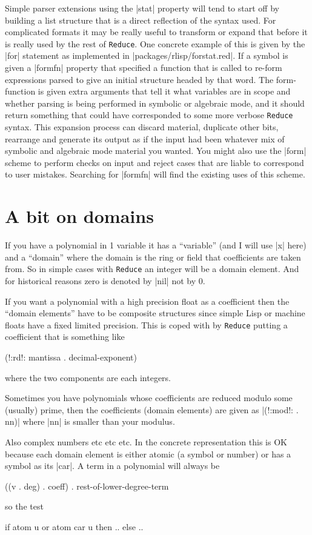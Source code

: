 \documentclass[12pt,twoside,openright]{memoir}
\newcommand{\reduce}{\texttt{Reduce}\xspace}
\begin{document}
Simple parser extensions using the |stat| property will tend to start off
by building a list structure that is a direct reflection of the syntax
used. For complicated formats it may be really useful to transform or
expand that before it is really used by the rest of \reduce. One concrete
example of this is given by the |for| statement as implemented in
|packages/rlisp/forstat.red|. If a symbol is given a |formfn| property that
specified a function that is called to re-form expressions parsed to give
an initial structure headed by that word. The form-function is given
extra arguments that tell it what variables are in scope and whether parsing
is being performed in symbolic or algebraic mode, and it should return
something that could have corresponded to some more verbose \reduce syntax.
This expansion process can discard material, duplicate other bits, rearrange
and generate its output as if the input had been whatever mix of symbolic
and algebraic mode material you wanted. You might also use the |form| scheme
to perform checks on input and reject cases that are liable to correspond to
user mistakes. Searching for |formfn| will find the existing uses of this
scheme.

\section{A bit on domains}

If you have a polynomial in 1 variable it has a ``variable'' (and I will use
|x| here) and a ``domain'' where the domain is the ring or field that
coefficients are taken from. So in simple cases with \reduce an integer will be
a domain element. And for historical reasons zero is denoted by |nil| not by
0.

If you want a polynomial with a high precision float as a coefficient then the
``domain elements'' have to be composite structures since simple Lisp or machine
floats have a fixed limited precision. This is coped with by \reduce putting a
coefficient that is something like
\begin{rlispverb}
  (!:rd!: mantissa . decimal-exponent)
\end{rlispverb}
where the two components are each integers.

Sometimes you have polynomials whose coefficients are reduced modulo some
(usually) prime, then the coefficients (domain elements) are given as
|(!:mod!: . nn)| where |nn| is smaller than your modulus.

Also complex numbers etc etc etc. In the concrete representation this is
OK because each domain element is either atomic (a symbol or number) or has a
symbol as its |car|. A term in a polynomial will always be
\begin{rlispverb}
  ((v . deg) . coeff) . rest-of-lower-degree-term
\end{rlispverb}
so the test
\begin{rlispverb}
  if atom u or atom car u then .. %
  else ..  %
\end{rlispverb}
\end{document}
